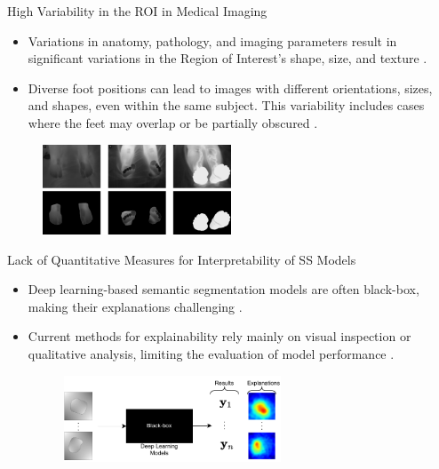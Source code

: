 \documentclass[aspectratio=169]{beamer}
\let\oldcite\cite %
\renewcommand{\cite}[1]{{\tiny\oldcite{#1}}}
\begin{document}
\begin{frame}{High Variability in the ROI in Medical Imaging}

\begin{itemize}
\setlength\itemsep{1em}
    \item Variations in anatomy, pathology, and imaging parameters result in significant variations in the Region of Interest's shape, size, and texture \cite{li2021systematic}.
    \item Diverse foot positions can lead to images with different orientations, sizes, and shapes, even within the same subject. This variability includes cases where the feet may overlap or be partially obscured \cite{arteaga2021segmentation}.
\end{itemize}
     
\begin{figure}
    \centering
    \includegraphics[width=0.5\textwidth]{Figures/high_roi_var.png}

\end{figure}

\end{frame}


\begin{frame}{Lack of Quantitative Measures for Interpretability of SS Models}

\begin{itemize}
\setlength\itemsep{1em}
    \item  Deep learning-based semantic segmentation models are often black-box, making their explanations challenging \cite{linardatos2020explainable}. 
    \item Current methods for explainability rely mainly on visual inspection or qualitative analysis, limiting the evaluation of model performance \cite{Wang_2022, salahuddin2022transparency}. 

    \begin{figure}
        \centering
        \includegraphics[width=0.61\textwidth]{Figures/lack_interpretability.pdf}
        
    \end{figure}
\end{itemize}

\end{frame}
\end{document}
